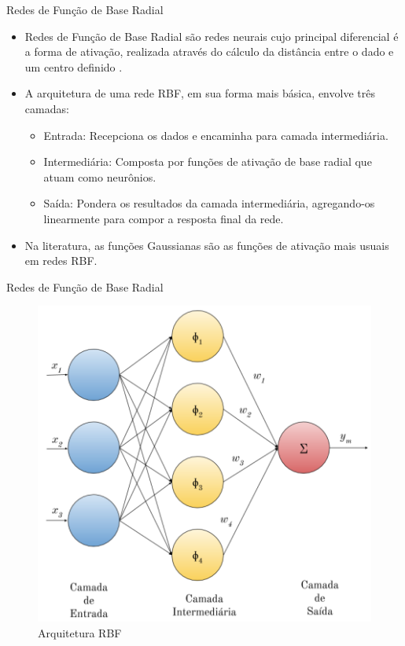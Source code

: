 \documentclass[10pt]{beamer}
\begin{document}

\begin{frame}{Redes de Função de Base Radial}
    \begin{itemize}
        \item<1 -> \alert{Redes de Função de Base Radial} são redes neurais cujo principal diferencial é a forma de ativação, realizada através do cálculo da distância entre o dado e um centro definido \cite{Braga:RedesNeuraisTeoriaAplicacoes}.
        \item<2 -> A arquitetura de uma rede RBF, em sua forma mais básica, envolve três camadas: 
        \begin{itemize}
            \item<3 -> \alert{Entrada}: Recepciona os dados e encaminha para camada intermediária.
            \item<4 -> \alert{Intermediária}: Composta por funções de ativação de base radial que atuam como neurônios.
            \item<5 -> \alert{Saída}: Pondera os resultados da camada intermediária, agregando-os linearmente para compor a resposta final da rede.
        \end{itemize}
        \item<6 -> Na literatura, as funções Gaussianas são as funções de ativação mais usuais em redes RBF.
      \end{itemize}
\end{frame}

\begin{frame}{Redes de Função de Base Radial}
    \begin{figure}[H]
    \begin{center}
        \includegraphics[scale=0.6]{../text/imagens/rbf_arq.png}
        \caption{Arquitetura RBF}
        \label{fig:rbg_arq}
    \end{center}
    \end{figure}
\end{frame}
\end{document}
